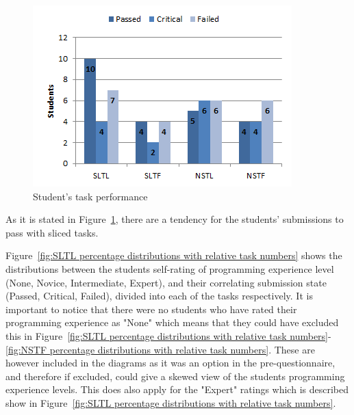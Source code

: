 \documentclass{sig-alternate-05-2015}
\begin{document}
\begin{figure}[!ht]
	\centering
	\includegraphics[width=1\linewidth]{img05}
	\caption{Student's task performance}
	\label{fig:Student's task performance}
\end{figure}

As it is stated in Figure~\ref{fig:Student's task performance}, there are a tendency for the students' submissions to pass with sliced tasks.

Figure~\ref{fig:SLTL percentage distributions with relative task numbers} shows the distributions between the students self-rating of programming experience level (None, Novice, Intermediate, Expert), and their correlating submission state (Passed, Critical, Failed), divided into each of the tasks respectively.
It is important to notice that there were no students who have rated their programming experience  as "None" which means that they could have excluded this in Figure~\ref{fig:SLTL percentage distributions with relative task numbers}-\ref{fig:NSTF percentage distributions with relative task numbers}. These are however included in the diagrams as it was an option in the pre-questionnaire, and therefore if excluded, could give a skewed view of the students programming experience levels. This does also apply for the "Expert" ratings which is described show in Figure~\ref{fig:SLTL percentage distributions with relative task numbers}.
\end{document}
